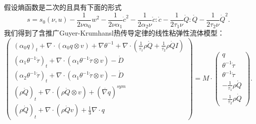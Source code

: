 假设熵函数是二次的且具有下面的形式
	\begin{equation*}
		s = s_0(\nu,u)  - \frac{1}{2\nu \alpha_0} w^2 - \frac{1}{2\nu \alpha_1} \dot{c}^2- \frac{1}{2\alpha_2 \nu} \mathring{c}:\mathring{c} - \frac{1}{2 \tau_1 \nu} \mathring{Q}: \mathring{Q} - \frac{1}{2  \tau_2 \nu} \dot{Q}^2.
 	\end{equation*}  
我们得到了含推广Guyer-Krumhansl热传导定律的线性粘弹性流体模型：
\begin{equation}\label{eq:CNSTgeneral}
   	\left( \begin{array}{c} 
			(\alpha_0 q)_t +  \nabla \cdot (\alpha_0  q \otimes v)  + \nabla \theta^{-1} + \nabla \cdot (\frac{1}{\tau_1} \rho \mathring{{Q}}+\frac{1}{\tau_2} \rho \dot{Q} I)\\
			(\alpha_1 \theta^{-1} \dot{\tau})_t +  \nabla \cdot (\alpha_1 \theta^{-1} \dot{\tau} \otimes v)  - \dot{D} \\
			(\alpha_2 \theta^{-1} \mathring{\tau})_t +  \nabla \cdot (\alpha_1 \theta^{-1} \mathring{\tau} \otimes v)  - \mathring{D} \\
			(\rho \mathring{{Q}})_t + \nabla \cdot (\rho \mathring{Q} \otimes v)+(\mathring{\nabla {q}})^{sym} \\ (\rho \dot{Q})_t + \nabla \cdot (\rho \dot{Q} v)+\frac{1}{3} \nabla \cdot {q}
		\end{array} \right) = M \cdot
		\left( \begin{array}{c} 
			q \\ \theta^{-1} \dot{\tau} \\ \theta^{-1} \mathring{\tau} \\ -\frac{1}{\tau_1} \rho \mathring{{Q}} \\ -\frac{1}{\tau_2} \rho \dot{{Q}}
		\end{array}\right).
\end{equation}

